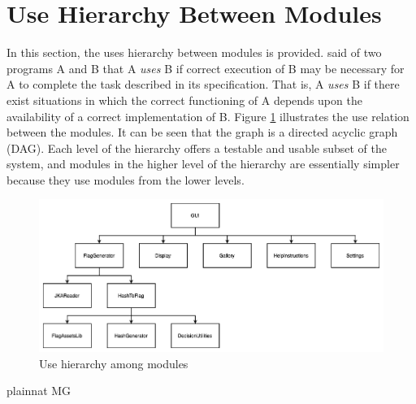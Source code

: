 \documentclass[12pt, titlepage]{article}
\begin{document}
\section{Use Hierarchy Between Modules} \label{SecUse}

In this section, the uses hierarchy between modules is
provided. \citet{Parnas1978} said of two programs A and B that A {\em uses} B if
correct execution of B may be necessary for A to complete the task described in
its specification. That is, A {\em uses} B if there exist situations in which
the correct functioning of A depends upon the availability of a correct
implementation of B.  Figure \ref{FigUH} illustrates the use relation between
the modules. It can be seen that the graph is a directed acyclic graph
(DAG). Each level of the hierarchy offers a testable and usable subset of the
system, and modules in the higher level of the hierarchy are essentially simpler
because they use modules from the lower levels.

\begin{figure}[H]
\centering
\includegraphics[width=1.0\textwidth]{UsesHierarchy.png}
\caption{Use hierarchy among modules}
\label{FigUH}
\end{figure}


 {plainnat}
 {MG}
\end{document}
